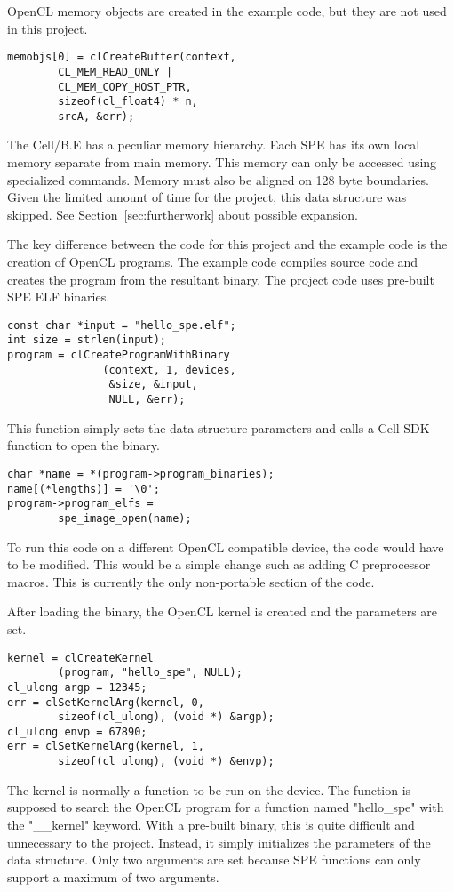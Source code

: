 OpenCL memory objects are created in the example code, but they are not used in this project. 
\begin{verbatim}
memobjs[0] = clCreateBuffer(context,
        CL_MEM_READ_ONLY |
        CL_MEM_COPY_HOST_PTR,
        sizeof(cl_float4) * n,
        srcA, &err);
\end{verbatim}
The Cell/B.E has a peculiar memory hierarchy. Each SPE has its own local memory separate from main memory. This memory can only be accessed using specialized commands. Memory must also be aligned on 128 byte boundaries. Given the limited amount of time for the project, this data structure was skipped. See Section~\ref{sec:furtherwork} about possible expansion.

The key difference between the code for this project and the example code is the creation of OpenCL programs. The example code compiles source code and creates the program from the resultant binary. The project code uses pre-built SPE ELF binaries.
\begin{verbatim}
const char *input = "hello_spe.elf";
int size = strlen(input);
program = clCreateProgramWithBinary
               (context, 1, devices, 
                &size, &input,
                NULL, &err);
\end{verbatim}
This function simply sets the data structure parameters and calls a Cell SDK function to open the binary.
\begin{verbatim}
char *name = *(program->program_binaries);
name[(*lengths)] = '\0';
program->program_elfs =
        spe_image_open(name);  
\end{verbatim}
To run this code on a different OpenCL compatible device, the code would have to be modified. This would be a simple change such as adding C preprocessor macros. This is currently the only non-portable section of the code.

After loading the binary, the OpenCL kernel is created and the parameters are set.
\begin{verbatim}
kernel = clCreateKernel
        (program, "hello_spe", NULL);
cl_ulong argp = 12345;
err = clSetKernelArg(kernel, 0,
        sizeof(cl_ulong), (void *) &argp);
cl_ulong envp = 67890;
err = clSetKernelArg(kernel, 1,
        sizeof(cl_ulong), (void *) &envp);
\end{verbatim}
The kernel is normally a function to be run on the device. The function is supposed to search the OpenCL program for a function named "hello\_spe" with the "\_\_kernel" keyword. With a pre-built binary, this is quite difficult and unnecessary to the project. Instead, it simply initializes the parameters of the data structure. Only two arguments are set because SPE functions can only support a maximum of two arguments.

